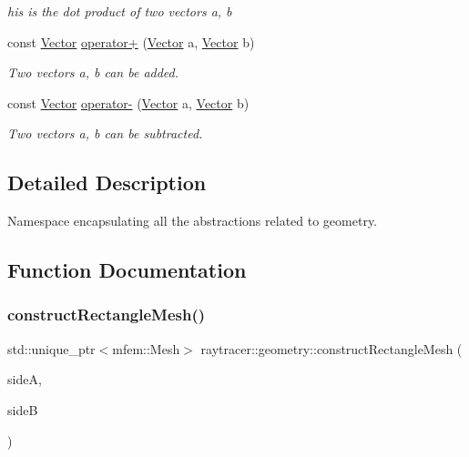 \begin{DoxyCompactItemize}
$$\begin{DoxyCompactList}\small\item\em his is the dot product of two vectors a, b \end{DoxyCompactList}\item 
const \hyperlink{classraytracer_1_1geometry_1_1Vector}{Vector} \hyperlink{namespaceraytracer_1_1geometry_a43e318baa7b3ea626fcf42c80f2e86c4}{operator+} (\hyperlink{classraytracer_1_1geometry_1_1Vector}{Vector} a, \hyperlink{classraytracer_1_1geometry_1_1Vector}{Vector} b)
\begin{DoxyCompactList}\small\item\em Two vectors a, b can be added. \end{DoxyCompactList}\item 
const \hyperlink{classraytracer_1_1geometry_1_1Vector}{Vector} \hyperlink{namespaceraytracer_1_1geometry_ab04e4d69ac25203a75381e41d6877493}{operator-\/} (\hyperlink{classraytracer_1_1geometry_1_1Vector}{Vector} a, \hyperlink{classraytracer_1_1geometry_1_1Vector}{Vector} b)
\begin{DoxyCompactList}\small\item\em Two vectors a, b can be subtracted. \end{DoxyCompactList}\end{DoxyCompactItemize}


\subsection{Detailed Description}
Namespace encapsulating all the abstractions related to geometry. 

\subsection{Function Documentation}
\mbox{\label{namespaceraytracer_1_1geometry_a8d4b7f6d4fec35e4deeb09ec86b3d140}} 
\subsubsection{\texorpdfstring{construct\+Rectangle\+Mesh()}{constructRectangleMesh()}}
{\footnotesize\ttfamily std\+::unique\+\_\+ptr$<$mfem\+::\+Mesh$>$ raytracer\+::geometry\+::construct\+Rectangle\+Mesh (\begin{DoxyParamCaption}\item[{\hyperlink{structraytracer_1_1geometry_1_1DiscreteLine}{Discrete\+Line}}]{sideA,  }\item[{\hyperlink{structraytracer_1_1geometry_1_1DiscreteLine}{Discrete\+Line}}]{sideB }\end{DoxyParamCaption})}




